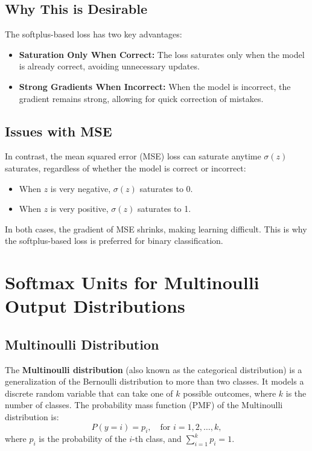 \begin{notechapter}
\subsection{Why This is Desirable}
The softplus-based loss has two key advantages:
\begin{itemize}
    \item \textbf{Saturation Only When Correct:} The loss saturates only when the model is already correct, avoiding unnecessary updates.
    \item \textbf{Strong Gradients When Incorrect:} When the model is incorrect, the gradient remains strong, allowing for quick correction of mistakes.
\end{itemize}

\subsection{Issues with MSE}
In contrast, the mean squared error (MSE) loss can saturate anytime \( \sigma(z) \) saturates, regardless of whether the model is correct or incorrect:
\begin{itemize}
    \item When \( z \) is very negative, \( \sigma(z) \) saturates to 0.
    \item When \( z \) is very positive, \( \sigma(z) \) saturates to 1.
\end{itemize}
In both cases, the gradient of MSE shrinks, making learning difficult. This is why the softplus-based loss is preferred for binary classification.

\section{Softmax Units for Multinoulli Output Distributions}

\subsection{Multinoulli Distribution}
The \textbf{Multinoulli distribution} (also known as the categorical distribution) is a generalization of the Bernoulli distribution to more than two classes. It models a discrete random variable that can take one of \( k \) possible outcomes, where \( k \) is the number of classes. The probability mass function (PMF) of the Multinoulli distribution is:
\[
P(y = i) = p_i, \quad \text{for } i = 1, 2, \dots, k,
\]
where \( p_i \) is the probability of the \( i \)-th class, and \( \sum_{i=1}^k p_i = 1 \).


\end{notechapter}
